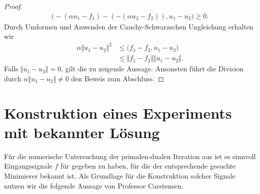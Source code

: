 \begin{proof}
\begin{align*}
    \big( -(\alpha u_1 - f_1) -(- (\alpha u_2 - f_2)), u_1 - u_2\big)
    \geq 0.
  \end{align*}
  Durch Umformen und Anwenden der Cauchy-Schwarzschen Ungleichung erhalten wir
  \begin{align*}
    \alpha \Vert u_1 - u_2 \Vert^2
    &\leq
    \big(f_1 -f_2, u_1-u_2 \big)\\
    &\leq
    \Vert f_1-f_2\Vert\Vert u_1 - u_2\Vert.
  \end{align*}
  Falls $\Vert u_1 - u_2 \Vert = 0$, gilt die zu zeigende Aussage.
  Ansonsten führt die Division durch $\alpha\Vert u_1 - u_2 \Vert\neq 0$ den
  Beweis zum Abschluss.
\end{proof}

\section{Konstruktion eines Experiments mit bekannter Lösung}
\label{sec:constructionInputSignal}

Für die numerische Untersuchung der primalen-dualen Iteration aus
 ist es sinnvoll
Eingangssignale $f$ für  gegeben zu haben, für die
der entsprechende gesuchte Minimierer bekannt ist. 
Als Grundlage für die Konstruktion solcher Signale nutzen wir die folgende 
Aussage von Professor Carstensen.

